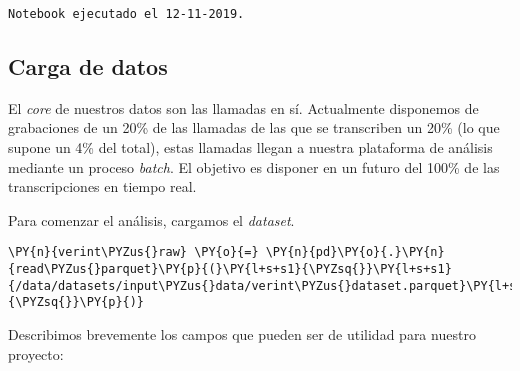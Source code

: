     \begin{Verbatim}[commandchars=\\\{\}]
Notebook ejecutado el 12-11-2019.
    \end{Verbatim}

    \hypertarget{carga-de-datos}{%
\subsection{Carga de datos}\label{carga-de-datos}}

    El \textit{core} de nuestros datos son las llamadas en sí. Actualmente disponemos de grabaciones de un 20\% de las llamadas de las que se transcriben un
20\% (lo que supone un 4\% del total), estas llamadas llegan a nuestra plataforma de análisis mediante un
proceso \textit{batch}. El objetivo es disponer en un futuro del 100\% de las
transcripciones en tiempo real.

Para comenzar el análisis, cargamos el \textit{dataset}.

\vspace{0.5cm}

    \begin{tcolorbox}[breakable, size=fbox, boxrule=1pt, pad at break*=1mm,colback=cellbackground, colframe=cellborder]
\begin{Verbatim}[commandchars=\\\{\}]
\PY{n}{verint\PYZus{}raw} \PY{o}{=} \PY{n}{pd}\PY{o}{.}\PY{n}{read\PYZus{}parquet}\PY{p}{(}\PY{l+s+s1}{\PYZsq{}}\PY{l+s+s1}{/data/datasets/input\PYZus{}data/verint\PYZus{}dataset.parquet}\PY{l+s+s1}{\PYZsq{}}\PY{p}{)}
\end{Verbatim}
\end{tcolorbox}

        
 Describimos brevemente los campos que pueden ser de utilidad para nuestro proyecto: 
 
